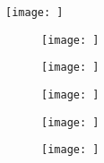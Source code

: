 
\begin{figure}[H]
    \centering
    \texttt{[image: ]}  %
    \caption{}          %
    \label{}            %
\end{figure}


\begin{figure}[H]
    \centering

    \begin{subfigure}{.5\textwidth}
        \centering
        \texttt{[image: ]} %
        \caption{}                      %
        \label{}                        %
    \end{subfigure}%
    \begin{subfigure}{.5\textwidth}
        \centering
        \texttt{[image: ]} %
        \caption{}                      %
        \label{}                        %
    \end{subfigure}

    \caption{}                          %
    \label{}                            %
\end{figure}


\begin{figure}[H]
    \centering

    \begin{subfigure}{.5\textwidth}
        \centering
        \texttt{[image: ]} %
        \caption{}                      %
        \label{}                        %
    \end{subfigure}%
    \begin{subfigure}{.5\textwidth}
        \centering
        \texttt{[image: ]} %
        \caption{}                      %
        \label{}                        %
    \end{subfigure}
    \begin{subfigure}{.5\textwidth}
        \centering
        \texttt{[image: ]} %
        \caption{}                      %
        \label{}                        %
    \end{subfigure}

    \caption{}                          %
    \label{}                            %
\end{figure}

